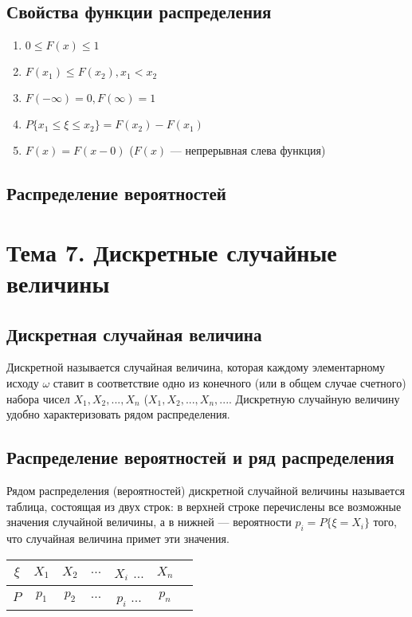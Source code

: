 \documentclass[12pt]{article}
\begin{document}
\subsection{Свойства функции распределения}
\begin{enumerate}
	\item $0 \leq F(x) \leq 1$
	\item $F(x_1) \leq F(x_2), x_1 < x_2$
	\item $F(-\infty) = 0, F(\infty) = 1$
	\item $P\{x_1 \leq \xi \leq x_2\} = F(x_2) - F(x_1)$
	\item $F(x) = F(x - 0)$ ($F(x)$ --- непрерывная слева функция)
\end{enumerate}

\subsection{Распределение вероятностей}

\section{Тема 7. Дискретные случайные величины}
\subsection{Дискретная случайная величина}
Дискретной называется случайная величина, которая каждому элементарному исходу $\omega$
ставит в соответствие одно из конечного (или в общем случае счетного) набора чисел
$X_1, X_2, ..., X_n$ ($X_1, X_2, ..., X_n, ...$.
Дискретную случайную величину удобно характеризовать рядом распределения.

\subsection{Распределение вероятностей и ряд распределения}
Рядом распределения (вероятностей) дискретной случайной величины называется таблица,
состоящая из двух строк:
в верхней строке перечислены все возможные значения случайной величины,
а в нижней --- вероятности $p_i = P\{\xi = X_i\}$ того, что случайная величина примет эти значения.
\begin{center}
	\begin{tabular}{| c | c | c | c | c | c | c |}
		\hline
		$\xi$ & $X_1$ & $X_2$ & $...$ & $X_i$ $...$ & $X_n$ \\
		\hline
		$P$   & $p_1$ & $p_2$ & $...$ & $p_i$ $...$ & $p_n$ \\
		\hline
	\end{tabular}
\end{center}
\end{document}
